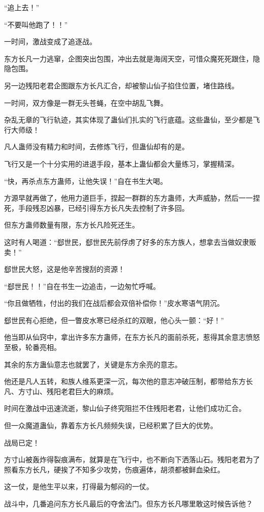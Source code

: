 \begin{this_body}
“追上去！”

“不要叫他跑了！！”

一时间，激战变成了追逐战。

东方长凡一力逃窜，企图突出包围，冲出去就是海阔天空，可惜众魔死死跟住，隐隐包围。

另一边残阳老君企图跟东方长凡汇合，却被黎山仙子掐住位置，堵住路线。

一时间，双方像是一群无头苍蝇，在空中胡乱飞舞。

杂乱无章的飞行轨迹，其实体现了蛊仙们扎实的飞行底蕴。这些蛊仙，至少都是飞行大师级！

凡人蛊师没有精力和时间，去修炼飞行，但蛊仙却有的是。

飞行又是一个十分实用的进退手段，基本上蛊仙都会大量练习，掌握精深。

“快，再杀点东方蛊师，让他失误！”自在书生大喝。

方源早就再做了，他用力道巨手，捏起一群群的东方蛊师，大声威胁，然后一一捏死，手段残忍凶暴，已经引得东方长凡失去控制了许多回。

但东方蛊师数量有限，东方长凡险死还生。

这时有人喝道：“郄世民，郄世民先前俘虏了好多的东方族人，想拿去当做奴隶贩卖！”

郄世民大怒，这是他辛苦搜刮的资源！

“郄世民！！”自在书生一边追击，一边匆忙呼喊。

“你且做牺牲，付出的我们在战后都会双倍补偿你！”皮水寒语气阴沉。

郄世民有心拒绝，但一瞥皮水寒已经杀红的双眼，他心头一颤：“好！”

他当即从仙窍中，拿出许多东方蛊师，在东方长凡的面前杀死，惹得其余意志愤怒至极，轮番亮相。

其余的东方蛊仙意志也就罢了，关键是东方余亮的意志。

他还是凡人五转，和族人维系更深一沉，每次他的意志冲破压制，都带给东方长凡、方寸山、残阳老君巨大的麻烦。

时间在激战中迅速流逝，黎山仙子终究阻拦不住残阳老君，让他们成功汇合。

但一众魔道蛊仙，靠着东方长凡频频失误，已经积累了巨大的优势。

战局已定！

方寸山被轰炸得裂痕满布，就算是在飞行中，也不断向下洒落山石。残阳老君为了照看东方长凡，硬挨了不知多少攻势，伤痕遍体，胡须都被鲜血染红。

这一仗，是他生平以来，打得最为郁闷的一仗。

战斗中，几番追问东方长凡最后的夺舍法门。但东方长凡哪里敢这时候告诉他？


\end{this_body}
